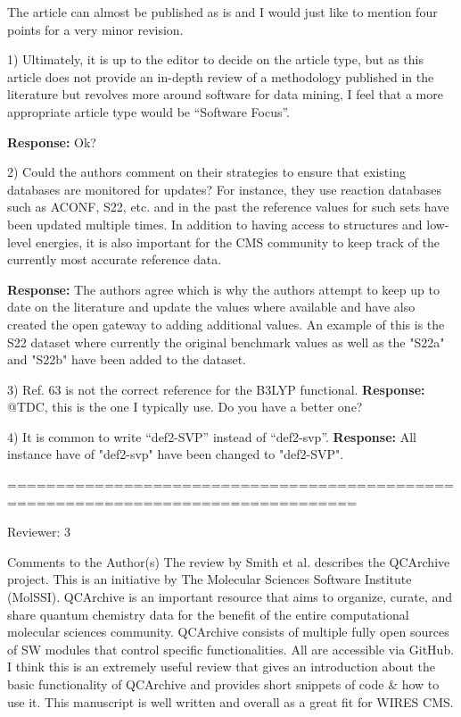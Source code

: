 The article can almost be published as is and I would just like to mention four points for a very minor revision.

1) Ultimately, it is up to the editor to decide on the article type, but as this article does not provide an in-depth review of a methodology published in the literature but revolves more around software for data mining, I feel that a more appropriate article type would be “Software Focus”.

\textbf{Response:} Ok?

2) Could the authors comment on their strategies to ensure that existing databases are monitored for updates? For instance, they use reaction databases such as ACONF, S22, etc. and in the past the reference values for such sets have been updated multiple times. In addition to having access to structures and low-level energies, it is also important for the CMS community to keep track of the currently most accurate reference data.

\textbf{Response:} The authors agree which is why the authors attempt to keep up to date on the literature and update the values where available and have also created the open gateway to adding additional values. An example of this is the S22 dataset where currently the original benchmark values as well as the "S22a" and "S22b" have been added to the dataset.

3) Ref. 63 is not the correct reference for the B3LYP functional. 
\textbf{Response:} @TDC, this is the one I typically use. Do you have a better one?

4) It is common to write “def2-SVP” instead of “def2-svp”.
\textbf{Response:} All instance have of "def2-svp" have been changed to "def2-SVP". 

==================================================================================

Reviewer: 3

Comments to the Author(s) 
The review by Smith et al. describes the QCArchive project. This is an initiative by The Molecular Sciences Software Institute (MolSSI). QCArchive is an important resource that aims to organize, curate, and share quantum chemistry data for the benefit of the entire computational molecular sciences community. QCArchive consists of multiple fully open sources of SW modules that control specific functionalities. All are accessible via GitHub. I think this is an extremely useful review that gives an introduction about the basic functionality of QCArchive and provides short snippets of code & how to use it. This manuscript is well written and overall as a great fit for WIRES CMS.


